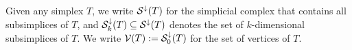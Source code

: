 \documentclass[10pt,a4paper]{article}
\begin{document}

Given any simplex $T$, we write ${\mathcal S}^{\downarrow}(T)$ for the simplicial complex that contains all subsimplices of $T$,
and ${\mathcal S}^{\downarrow}_{{k}}(T) \subseteq {\mathcal S}^{\downarrow}(T)$ denotes the set of $k$-dimensional subsimplices of $T$. 
We write ${\mathcal V}(T) := {\mathcal S}^{\downarrow}_{0}(T)$ for the set of vertices of $T$.
\end{document}
